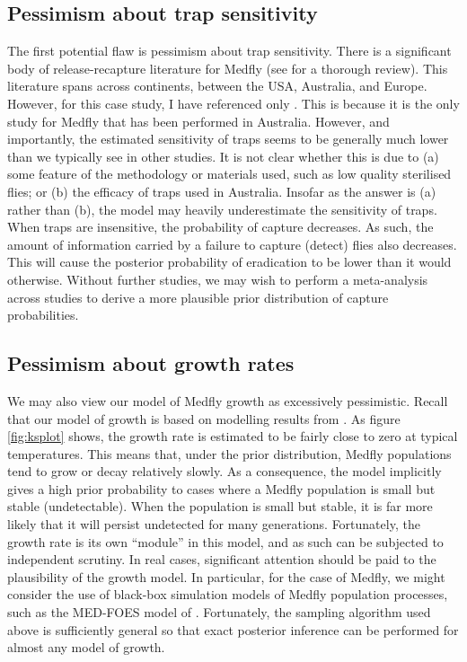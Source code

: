 \documentclass[
  oneside]{book}
\begin{document}
\hypertarget{pessimism-about-trap-sensitivity}{%
\subsection{Pessimism about trap sensitivity}\label{pessimism-about-trap-sensitivity}}

The first potential flaw is pessimism about trap sensitivity. There is a significant body of release-recapture literature for Medfly (see \citet{andress2013} for a thorough review). This literature spans across continents, between the USA, Australia, and Europe. However, for this case study, I have referenced only \citet{ms2007}. This is because it is the only study for Medfly that has been performed in Australia. However, and importantly, the estimated sensitivity of traps seems to be generally much lower than we typically see in other studies. It is not clear whether this is due to (a) some feature of the methodology or materials used, such as low quality sterilised flies; or (b) the efficacy of traps used in Australia. Insofar as the answer is (a) rather than (b), the model may heavily underestimate the sensitivity of traps. When traps are insensitive, the probability of capture decreases. As such, the amount of information carried by a failure to capture (detect) flies also decreases. This will cause the posterior probability of eradication to be lower than it would otherwise. Without further studies, we may wish to perform a meta-analysis across studies to derive a more plausible prior distribution of capture probabilities.

\hypertarget{pessimism-about-growth-rates}{%
\subsection{Pessimism about growth rates}\label{pessimism-about-growth-rates}}

We may also view our model of Medfly growth as excessively pessimistic. Recall that our model of growth is based on modelling results from \citet{ks2019}. As figure \ref{fig:ksplot} shows, the growth rate is estimated to be fairly close to zero at typical temperatures. This means that, under the prior distribution, Medfly populations tend to grow or decay relatively slowly. As a consequence, the model implicitly gives a high prior probability to cases where a Medfly population is small but stable (undetectable). When the population is small but stable, it is far more likely that it will persist undetected for many generations. Fortunately, the growth rate is its own ``module'' in this model, and as such can be subjected to independent scrutiny. In real cases, significant attention should be paid to the plausibility of the growth model. In particular, for the case of Medfly, we might consider the use of black-box simulation models of Medfly population processes, such as the MED-FOES model of \citet{manoukis2014}. Fortunately, the sampling algorithm used above is sufficiently general so that exact posterior inference can be performed for almost any model of growth.
\end{document}
